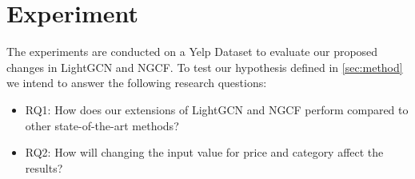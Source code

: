 \section{Experiment}\label{sec:experiment}
The experiments are conducted on a Yelp Dataset to evaluate our proposed changes in LightGCN and NGCF.
To test our hypothesis defined in \autoref{sec:method} we intend to answer the following research questions:
\begin{itemize}
    \item RQ1: How does our extensions of LightGCN and NGCF perform compared to other state-of-the-art methods?
    \item RQ2: How will changing the input value for price and category affect the results?
\end{itemize}





